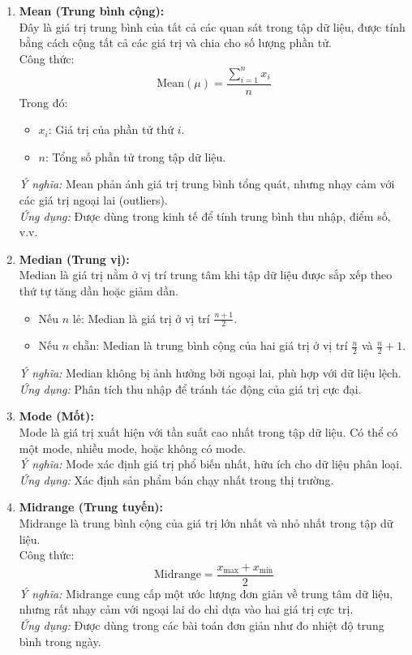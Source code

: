 \documentclass[a4paper,12pt]{article}
\begin{document}
\begin{enumerate}[label=\Roman*.]
    \item \textbf{Mean (Trung bình cộng):} \\
    Đây là giá trị trung bình của tất cả các quan sát trong tập dữ liệu, được tính bằng cách cộng tất cả các giá trị và chia cho số lượng phần tử. \\
    Công thức:
    \[
    \text{Mean} (\mu) = \frac{\sum_{i=1}^{n} x_i}{n}
    \]
    Trong đó:
    \begin{itemize}
        \item \(x_i\): Giá trị của phần tử thứ \(i\).
        \item \(n\): Tổng số phần tử trong tập dữ liệu.
    \end{itemize}
    \textit{Ý nghĩa:} Mean phản ánh giá trị trung bình tổng quát, nhưng nhạy cảm với các giá trị ngoại lai (outliers). \\
    \textit{Ứng dụng:} Được dùng trong kinh tế để tính trung bình thu nhập, điểm số, v.v.

    \item \textbf{Median (Trung vị):} \\
    Median là giá trị nằm ở vị trí trung tâm khi tập dữ liệu được sắp xếp theo thứ tự tăng dần hoặc giảm dần.
    \begin{itemize}
        \item Nếu \(n\) lẻ: Median là giá trị ở vị trí \(\frac{n+1}{2}\).
        \item Nếu \(n\) chẵn: Median là trung bình cộng của hai giá trị ở vị trí \(\frac{n}{2}\) và \(\frac{n}{2} + 1\).
    \end{itemize}
    \textit{Ý nghĩa:} Median không bị ảnh hưởng bởi ngoại lai, phù hợp với dữ liệu lệch. \\
    \textit{Ứng dụng:} Phân tích thu nhập để tránh tác động của giá trị cực đại.

    \item \textbf{Mode (Mốt):} \\
    Mode là giá trị xuất hiện với tần suất cao nhất trong tập dữ liệu. Có thể có một mode, nhiều mode, hoặc không có mode. \\
    \textit{Ý nghĩa:} Mode xác định giá trị phổ biến nhất, hữu ích cho dữ liệu phân loại. \\
    \textit{Ứng dụng:} Xác định sản phẩm bán chạy nhất trong thị trường.

    \item \textbf{Midrange (Trung tuyến):} \\
    Midrange là trung bình cộng của giá trị lớn nhất và nhỏ nhất trong tập dữ liệu. \\
    Công thức:
    \[
    \text{Midrange} = \frac{x_{\text{max}} + x_{\text{min}}}{2}
    \]
    \textit{Ý nghĩa:} Midrange cung cấp một ước lượng đơn giản về trung tâm dữ liệu, nhưng rất nhạy cảm với ngoại lai do chỉ dựa vào hai giá trị cực trị. \\
    \textit{Ứng dụng:} Được dùng trong các bài toán đơn giản như đo nhiệt độ trung bình trong ngày.
\end{enumerate}
\end{document}
